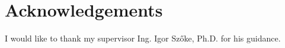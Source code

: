 \documentclass{ExcelAtFIT}
\begin{document}
\section*{Acknowledgements}
I would like to thank my supervisor Ing. Igor Szőke, Ph.D. for his guidance.





\end{document}
